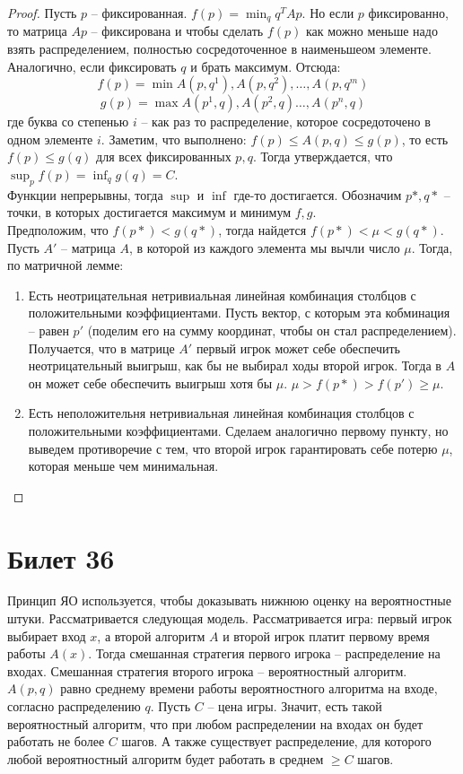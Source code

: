 \documentclass[12pt, letterpaper]{article}
\begin{document}
\begin{proof}
Пусть $p$ -- фиксированная. $f(p) = \min_{q} q^T A p$. Но если $p$ фиксированно, то матрица $Ap$ -- фиксирована и чтобы сделать $f(p)$ как можно меньше надо взять распределением, полностью сосредоточенное в наименьшеом элементе. Аналогично, если фиксировать $q$ и брать максимум. Отсюда:
$$
f(p) = \min{A(p, q^1), A(p, q^2), \ldots, A(p, q^m)}
$$ 
$$
g(p) = \max{A(p^1, q), A(p^2, q) \ldots, A(p^n, q)}
$$
где буква со степенью $i$ -- как раз то распределение, которое сосредоточено в одном элементе $i$.
Заметим, что выполнено:
$f(p) \leq A(p, q) \leq g(p)$, то есть $f(p) \leq g(q)$ для всех фиксированных $p,q$.
Тогда утверждается, что $\sup_{p} f(p) = \inf_{q} g(q) = C$. \\
Функции непрерывны, тогда $\sup$ и $\inf$ где-то достигается. Обозначим $p*, q*$ -- точки, в которых достигается максимум и минимум $f, g$.\\
Предположим, что $f(p*) < g(q*)$, тогда найдется $f(p*) < \mu < g(q*)$. Пусть $A'$ -- матрица $A$, в которой из каждого элемента мы вычли число $\mu$. Тогда, по матричной лемме:
\begin{enumerate}
\item Есть неотрицательная нетривиальная линейная комбинация столбцов с положительными коэффициентами. Пусть вектор, с которым эта кобминация -- равен $p'$ (поделим его на сумму координат, чтобы он стал распределением). Получается, что в матрице $A'$ первый игрок может себе обеспечить неотрицательный выигрыш, как бы не выбирал ходы второй игрок. Тогда в $A$ он может себе обеспечить выигрыш хотя бы $\mu$. $\mu > f(p*) > f(p') \geq \mu$.
\item Есть неположительня нетривиальная линейная комбинация столбцов с положительными коэффициентами. Сделаем аналогично первому пункту, но выведем противоречие с тем, что второй игрок гарантировать себе потерю $\mu$, которая меньше чем минимальная.
\end{enumerate}
\end{proof}

\section{Билет 36}
Принцип ЯО используется, чтобы доказывать нижнюю оценку на вероятностные штуки. Рассматривается следующая модель. Рассматривается игра: первый игрок выбирает вход $x$, а второй алгоритм $A$ и второй игрок платит первому время работы $A(x)$. Тогда смешанная стратегия первого игрока -- распределение на входах. Смешанная стратегия второго игрока -- вероятностный алгоритм. $A(p,q)$ равно среднему времени работы вероятностного алгоритма на входе, согласно распределению $q$. Пусть $C$ -- цена игры. Значит, есть такой вероятностный алгоритм, что при любом распределении на входах он будет работать не более $C$ шагов. А также существует распределение, для которого любой вероятностный алгоритм будет работать в среднем $\geq C$ шагов.
\end{document}
